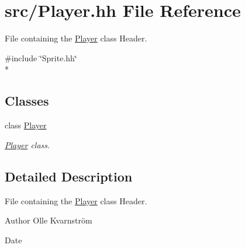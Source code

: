 \hypertarget{Player_8hh}{\section{src/\-Player.hh File Reference}
\label{Player_8hh}
}


File containing the \hyperlink{classPlayer}{Player} class Header.  


{\ttfamily \#include \char`\"{}Sprite.\-hh\char`\"{}}\\*
\subsection*{Classes}
\begin{DoxyCompactItemize}
\item 
class \hyperlink{classPlayer}{Player}
\begin{DoxyCompactList}\small\item\em \hyperlink{classPlayer}{Player} class. \end{DoxyCompactList}\end{DoxyCompactItemize}


\subsection{Detailed Description}
File containing the \hyperlink{classPlayer}{Player} class Header. \begin{DoxyAuthor}{Author}
Olle Kvarnström 
\end{DoxyAuthor}
\begin{DoxyDate}{Date}

\end{DoxyDate}
